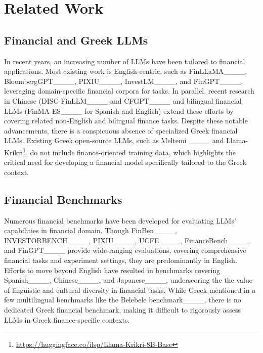 \section{Related Work}
\subsection{Financial and Greek LLMs}
In recent years, an increasing number of LLMs have been tailored to financial applications. 
Most existing work is English-centric, such as FinLLaMA____, BloombergGPT____, PIXIU____, InvestLM____, and FinGPT____, leveraging domain-specific financial corpora for tasks. 
In parallel, recent research in Chinese (DISC-FinLLM____ and CFGPT____ and bilingual financial LLMs (FinMA-ES____ for Spanish and English) extend these efforts by covering related non-English and bilingual finance tasks. 
Despite these notable advancements, there is a conspicuous absence of specialized Greek financial LLMs. Existing Greek open-source LLMs, such as Meltemi ____ and Llama-Krikri\footnote{\url{https://huggingface.co/ilsp/Llama-Krikri-8B-Base}}, do not include finance-oriented training data, which highlights the critical need for developing a financial model specifically tailored to the Greek context.

\subsection{Financial Benchmarks}
Numerous financial benchmarks have been developed for evaluating LLMs' capabilities in financial domain.
Though FinBen____, INVESTORBENCH____, PIXIU____, UCFE____, FinanceBench____, and FinGPT____ provide wide-ranging evaluations, covering comprehensive financial tasks and experiment settings, they are predominantly in English.
Efforts to move beyond English have resulted in benchmarks covering Spanish____, Chinese____, and Japanese____, underscoring the the value of linguistic and cultural diversity in financial tasks. 
While Greek mentioned in a few multilingual benchmarks like the Belebele benchmark____, there is no dedicated Greek financial benchmark, making it difficult to rigorously assess LLMs in Greek finance-specific contexts.

